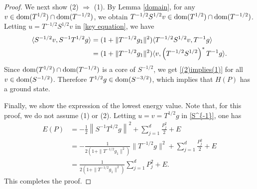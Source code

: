 \documentclass[12pt]{article}
\theoremstyle{plain}
\numberwithin{equation}{section}
\theoremstyle{remark}
\begin{document}
\begin{proof}
We next show (2) $\Rightarrow$ (1).
By Lemma \ref{domain}, for any $v\in\mathop{\mathrm{dom}}(T^{1/2})\cap\mathop{\mathrm{dom}}(T^{-1/2})$, we obtain $T^{-1/2}S^{1/2}v\in\mathop{\mathrm{dom}}(T^{1/2})\cap\mathop{\mathrm{dom}}(T^{-1/2})$.
Letting $u=T^{-1/2}S^{1/2}v$ in \eqref{key equation}, we have
\begin{align}\label{(2)implies(1)}
\langle S^{-1/2}v,S^{-1}T^{1/2}g\rangle 
&= (1+\|T^{-1/2}g_1\|^2)\langle T^{-1/2}S^{1/2}v,T^{-1}g\rangle\notag\\ 
&= (1+\|T^{-1/2}g_1\|^2)\langle v,\left(T^{-1/2}S^{1/2}\right)^*T^{-1}g\rangle.
\end{align}
Since $\mathop{\mathrm{dom}}(T^{1/2})\cap\mathop{\mathrm{dom}}(T^{-1/2})$ is a core of $S^{-1/2}$, we get \eqref{(2)implies(1)} for all $v\in\mathop{\mathrm{dom}}(S^{-1/2})$.
Therefore $T^{1/2}g\in\mathop{\mathrm{dom}}(S^{-3/2})$, which implies that $H(P)$ has a ground state.

Finally, we show the expression of the lowest energy value.
Note that, for this proof, we do not assume (1) or (2).
Letting $u=v=T^{1/2}g$ in \eqref{S^{-1}}, one has
\begin{align*}
E(P) &= -\frac{1}{2}\left\|S^{-1}T^{1/2}g\right\|^2+\sum_{j=1}^d\frac{P_j^2}{2}+ E\\
&= -\frac{1}{2(1+\|T^{-1/2}g_1\|^2)}\|T^{-1/2}g\|^2+\sum_{j=1}^d\frac{P_j^2}{2}+ E\\
&= \frac{1}{2(1+\|T^{-1/2}g_1\|^2)}\sum_{j=1}^d P_j^2+ E.
\end{align*}
This completes the proof.
\end{proof}





\appendix

\end{document}

